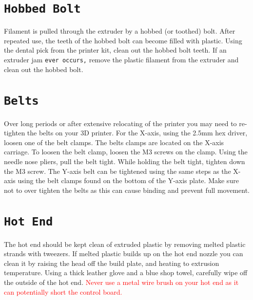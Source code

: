 \section{\texttt{Hobbed Bolt}}
Filament is pulled through the extruder by a hobbed (or toothed) bolt. After repeated use, the teeth of the hobbed bolt can become filled with plastic. Using the dental pick from the printer kit, clean out the hobbed bolt teeth. If an extruder jam \texttt{ever occurs,} remove the plastic filament from the extruder and clean out the hobbed bolt.

\begin{comment}
\section{Software}
\index{software}
\index{download}
Aleph Objects, Inc.\textsuperscript{\miniscule{\textregistered}} will release a new stable version of Cura LulzBot\textsuperscript{\miniscule{\textregistered}} Edition, typically every quarter. It is best to update Cura every time a new version is released. Each software update can bring advances in print quality, reliability, and print times. The files are available at \texttt{http://lulzbot.com/cura}. You can also find updated software versions in the Download section at: \texttt{http://LulzBot.com/downloads}.
\end{comment}

\section{\texttt{Belts}}
Over long periods or after extensive relocating of the printer you may need to re-tighten the belts on your 3D printer. For the X-axis, using the 2.5mm hex driver, loosen one of the belt clamps. The belts clamps are located on the X-axis carriage. To loosen the belt clamp, loosen the M3 screws on the clamp. Using the needle nose pliers, pull the belt tight. While holding the belt tight, tighten down the M3 screw. The Y-axis belt can be tightened using the same steps as the X-axis using the belt clamps found on the bottom of the Y-axis plate. Make sure not to over tighten the belts as this can cause binding and prevent full movement.

\section{\texttt{Hot End}}
The hot end should be kept clean of extruded plastic by removing melted plastic strands with tweezers. If melted plastic builds up on the hot end nozzle you can clean it by raising the head off the build plate, and heating to extrusion temperature. Using a thick leather glove and a blue shop towel, carefully wipe off the outside of the hot end. \textcolor{red}{Never use a metal wire brush on your hot end as it can potentially short the control board.}

